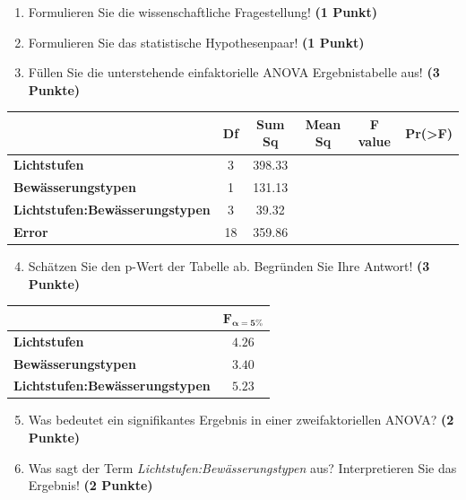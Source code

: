 \documentclass[a4paper, 9pt]{scrartcl}\usepackage[]{graphicx}\usepackage[]{xcolor}
\begin{document}
\begin{enumerate}
  \item Formulieren Sie die wissenschaftliche Fragestellung! \textbf{(1 Punkt)}
  \item Formulieren Sie das statistische Hypothesenpaar! \textbf{(1 Punkt)}
\item Füllen Sie die unterstehende einfaktorielle ANOVA Ergebnistabelle aus! \textbf{(3 Punkte)}
\end{enumerate}

\vspace{1Ex}

\begin{center}
  \Large
  \begin{tabular}{lccccc}
  \toprule
     & \textbf{Df} & \textbf{Sum Sq} & \textbf{Mean Sq} & \textbf{F value} & \textbf{Pr(>F)} \strut\\
    \midrule
   \textbf{Lichtstufen}  & 3 & 398.33 &  &  &  \strut\\
    \textbf{Bewässerungstypen}  & 1 & 131.13 &  &  &  \strut\\
    \textbf{Lichtstufen:Bewässerungstypen}  & 3 & 39.32 &  &  &  \strut\\
   \textbf{Error}  & 18 & 359.86 &  &  &  \strut\\
\bottomrule
  \end{tabular}
\end{center}

\vspace{1Ex}

\begin{enumerate}
  \setcounter{enumi}{3}
\item Schätzen Sie den p-Wert der Tabelle ab. Begründen Sie Ihre
  Antwort! \textbf{(3 Punkte)}
\end{enumerate}
  
\begin{center}
    \Large
\begin{tabular}{lc}
  \toprule
     & $\boldsymbol{F_{\alpha = 5\%}}$ \\
\midrule
  \textbf{Lichtstufen} & $4.26$ \\
  \textbf{Bewässerungstypen} & $3.40$ \\
  \textbf{Lichtstufen:Bewässerungstypen} & $5.23$ \\
  \bottomrule
  \end{tabular}
\end{center}

\begin{enumerate}
  \setcounter{enumi}{4}
\item Was bedeutet ein signifikantes Ergebnis in einer zweifaktoriellen ANOVA? \textbf{(2 Punkte)}
\item Was sagt der Term \textit{Lichtstufen:Bewässerungstypen} aus? Interpretieren Sie das Ergebnis! \textbf{(2 Punkte)}
\end{enumerate}
 
\end{document}
